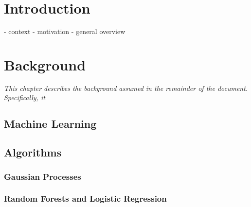 \documentclass[a4paper,12pt,twoside,openright]{report}
\begin{document}
\pagestyle{empty}
\singlespacing

\onehalfspacing

\singlespacing


\setcounter{page}{0}
\pagestyle{plain}
\tableofcontents
\listoffigures
\listoftables

\onehalfspacing


\chapter{Introduction}
\setcounter{page}{1} 

- context
- motivation
- general overview





\chapter{Background}

\textit{This chapter describes the background assumed in the remainder of the document. Specifically, it }
\section{Machine Learning}
\section{Algorithms}
\subsection{Gaussian Processes}
\subsection{Random Forests and Logistic Regression}

\end{document}
